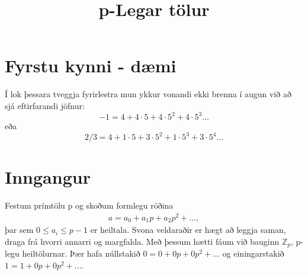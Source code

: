 

\title{p-Legar tölur}

\maketitle
\section*{Fyrstu kynni - dæmi}
Í lok þessara tveggja fyrirlestra mun ykkur vonandi ekki brenna í augun við að sjá eftirfarandi jöfnur:
\begin{equation*}
-1 = 4 + 4\cdot 5+4\cdot 5^2+4\cdot 5^3 \ldots
\end{equation*}
eða 
\begin{equation*}
 2/3 = 4 + 1\cdot 5+3\cdot 5^2+1\cdot 5^3 +3\cdot 5^4 \ldots
\end{equation*}


\section*{Inngangur}
Festum prímtölu p og skoðum formlegu röðina
\begin{align*}
a = a_0 + a_1 p + a_2 p^2 + ...,
\end{align*}
þar sem $0 \leq a_i \leq p-1$ er heiltala. 
Svona veldaraðir er hægt að leggja saman, draga frá hvorri annarri
 og margfalda.
Með þessum hætti fáum við bauginn $\mathbb{Z}_p$, p-legu heiltölurnar.
Þær hafa núllstakið $0 = 0+0p+0p^2+...$ og 
einingarstakið $1 = 1 + 0p+0p^2+...$.

